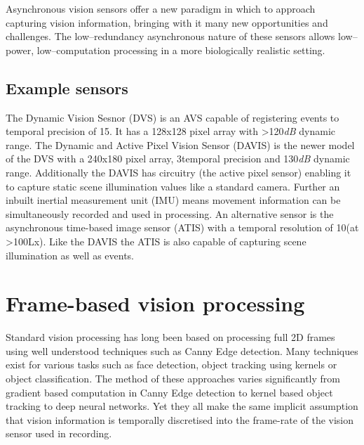 Asynchronous vision sensors offer a new paradigm in which to approach capturing vision information, bringing with it many new opportunities and challenges. 
The low--redundancy asynchronous nature of these sensors allows low--power, low--computation processing in a more biologically realistic setting.



\subsection{Example sensors}
The Dynamic Vision Sesnor (DVS) is an AVS capable of registering events to temporal precision of 15\us\cite{delbruck2008}. 
It has a 128x128 pixel array with \textgreater 120\textit{dB} dynamic range.
The Dynamic and Active Pixel Vision Sensor (DAVIS) is the newer model of the DVS with a 240x180 pixel array, 3\us temporal precision and 130\textit{dB} dynamic range\cite{DAVIS}. 
Additionally the DAVIS has circuitry (the active pixel sensor) enabling it to capture static scene illumination values like a standard camera.
Further an inbuilt inertial measurement unit (IMU) means movement information can be simultaneously recorded and used in processing. 
An alternative sensor is the asynchronous time-based image sensor (ATIS) with a temporal resolution of 10\us (at \textgreater100Lx)\cite{posch2011qvga}.
Like the DAVIS the ATIS is also capable of capturing scene illumination as well as events.  





\section{Frame-based vision processing}   %

Standard vision processing has long been based on processing full 2D frames using well understood techniques such as Canny Edge detection\cite{canny1986computational}. 
Many techniques exist for various tasks such as face detection\cite{viola2004robust}, object tracking using kernels\cite{comaniciu2003kernel} or object classification\cite{krizhevsky2012imagenet}.
The method of these approaches varies significantly from gradient based computation in Canny Edge detection to kernel based object tracking to deep neural networks.
Yet they all make the same implicit assumption that vision information is temporally discretised into the frame-rate of the vision sensor used in recording. 

